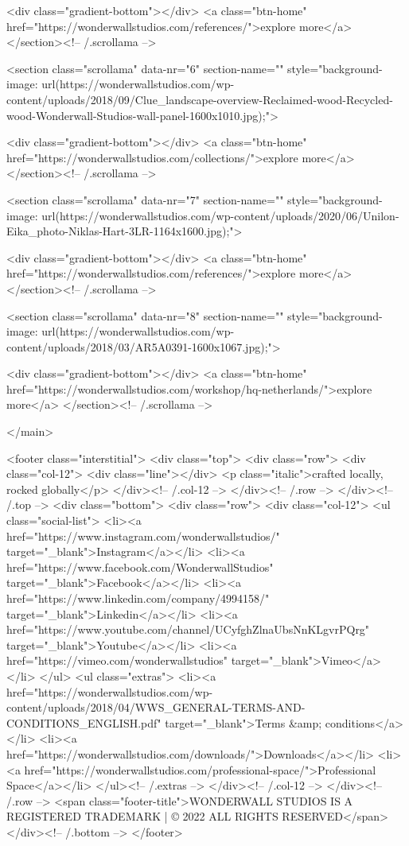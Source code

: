     <div class="gradient-bottom"></div>
    <a class="btn-home" href="https://wonderwallstudios.com/references/">explore more</a>
</section><!-- /.scrollama -->


<section class="scrollama" data-nr="6" section-name="" style="background-image: url(https://wonderwallstudios.com/wp-content/uploads/2018/09/Clue_landscape-overview-Reclaimed-wood-Recycled-wood-Wonderwall-Studios-wall-panel-1600x1010.jpg);">

    <div class="gradient-bottom"></div>
    <a class="btn-home" href="https://wonderwallstudios.com/collections/">explore more</a>
</section><!-- /.scrollama -->


<section class="scrollama" data-nr="7" section-name="" style="background-image: url(https://wonderwallstudios.com/wp-content/uploads/2020/06/Unilon-Eika_photo-Niklas-Hart-3LR-1164x1600.jpg);">

    <div class="gradient-bottom"></div>
    <a class="btn-home" href="https://wonderwallstudios.com/references/">explore more</a>
</section><!-- /.scrollama -->


<section class="scrollama" data-nr="8" section-name="" style="background-image: url(https://wonderwallstudios.com/wp-content/uploads/2018/03/AR5A0391-1600x1067.jpg);">

    <div class="gradient-bottom"></div>
    <a class="btn-home" href="https://wonderwallstudios.com/workshop/hq-netherlands/">explore more</a>
</section><!-- /.scrollama -->


</main>

<footer class="interstitial">
  <div class="top">
    <div class="row">
      <div class="col-12">
        <div class="line"></div>
        <p class="italic">crafted locally, rocked globally</p>
      </div><!-- /.col-12 -->
    </div><!-- /.row -->
  </div><!-- /.top -->
  <div class="bottom">
    <div class="row">
      <div class="col-12">
        <ul class="social-list">
          <li><a href="https://www.instagram.com/wonderwallstudios/" target="_blank">Instagram</a></li>
          <li><a href="https://www.facebook.com/WonderwallStudios" target="_blank">Facebook</a></li>
          <li><a href="https://www.linkedin.com/company/4994158/" target="_blank">Linkedin</a></li>
          <li><a href="https://www.youtube.com/channel/UCyfghZlnaUbsNnKLgvrPQrg" target="_blank">Youtube</a></li>
          <li><a href="https://vimeo.com/wonderwallstudios" target="_blank">Vimeo</a></li>
        </ul>
        <ul class="extras">
          <li><a href="https://wonderwallstudios.com/wp-content/uploads/2018/04/WWS_GENERAL-TERMS-AND-CONDITIONS_ENGLISH.pdf" target="_blank">Terms &amp; conditions</a></li>
          <li><a href="https://wonderwallstudios.com/downloads/">Downloads</a></li>
          <li><a href="https://wonderwallstudios.com/professional-space/">Professional Space</a></li>
        </ul><!-- /.extras -->
      </div><!-- /.col-12 -->
    </div><!-- /.row -->
    <span class="footer-title">WONDERWALL STUDIOS IS A REGISTERED TRADEMARK  |  © 2022 ALL RIGHTS RESERVED</span>
  </div><!-- /.bottom -->
</footer>

